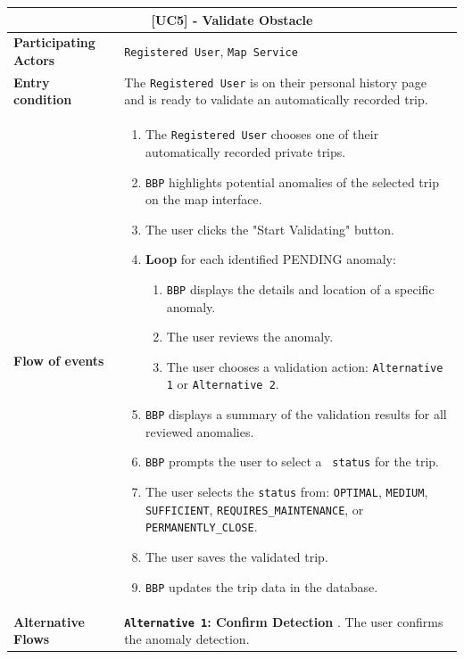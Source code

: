 \begin{table}[H]
\centering
\begin{tabularx}{\textwidth}{|l|X|}
\hline
\multicolumn{2}{|c|}{\textbf{[UC5] - Validate Obstacle}} \\ \hline
\textbf{Participating Actors} & \texttt{Registered User}, \texttt{Map Service} \\ \hline
\textbf{Entry condition}      & The \texttt{Registered User} is on their personal history page and is ready to validate an automatically recorded trip. \\ \hline
\textbf{Flow of events}       & 
\begin{enumerate}
    \item The \texttt{Registered User} chooses one of their automatically recorded private trips.
    \item \texttt{BBP} highlights potential anomalies of the selected trip on the map interface.
    \item The user clicks the "Start Validating" button.
    \item \textbf{Loop} for each identified \texttt{}{PENDING} anomaly:
    \begin{enumerate}
        \item \texttt{BBP} displays the details and location of a specific anomaly.
        \item The user reviews the anomaly.
        \item The user chooses a validation action: \texttt{Alternative 1} or \texttt{Alternative 2}.
    \end{enumerate}
    \item \texttt{BBP} displays a summary of the validation results for all reviewed anomalies.
    \item \texttt{BBP} prompts the user to select a \texttt{ status} for the trip.
    \item The user selects the \texttt{status} from: \texttt{OPTIMAL}, \texttt{MEDIUM}, \texttt{SUFFICIENT}, \texttt{REQUIRES\_MAINTENANCE}, or \texttt{PERMANENTLY\_CLOSE}.
    \item The user saves the validated trip.
    \item \texttt{BBP} updates the trip data in the database.
\end{enumerate} \\ \hline
\textbf{Alternative Flows}    & 
\textbf{\texttt{Alternative 1}: Confirm Detection} \newline
1. The user confirms the anomaly detection. \newline

\end{tabularx}
\end{table}
